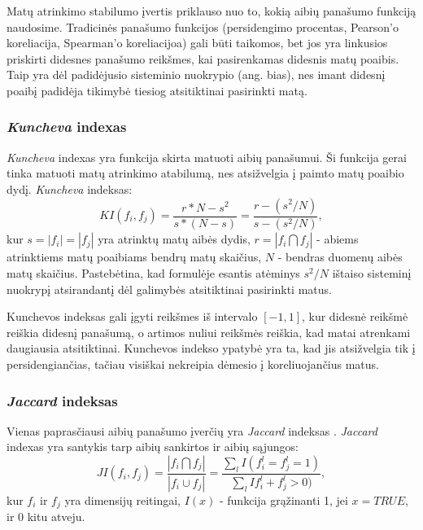 Matų atrinkimo stabilumo įvertis priklauso nuo to, kokią aibių panašumo funkciją naudosime. Tradicinės panašumo funkcijos (persidengimo procentas, Pearson'o koreliacija, Spearman'o koreliacijoa) gali būti taikomos, bet jos yra linkusios priskirti didesnes panašumo reikšmes, kai pasirenkamas didesnis matų poaibis. Taip yra dėl padidėjusio sisteminio nuokrypio (ang. bias), nes imant didesnį poaibį padidėja tikimybė tiesiog atsitiktinai pasirinkti matą.

\subsubsection{\textit{Kuncheva} indexas}

\textit{Kuncheva} indexas \cite{DBLP:conf/aia/Kuncheva07} yra funkcija skirta matuoti aibių panašumui. Ši funkcija gerai tinka matuoti matų atrinkimo atabilumą, nes atsižvelgia į paimto matų poaibio dydį. \textit{Kuncheva} indeksas:
\begin{equation}
\label{kuncheva_index}
 KI(f_i, f_j)=\frac{r*N - s^2}{s*(N-s)}=\frac{r - (s^2/N)}{s - (s^2/N)},
\end{equation}		
kur $s=|f_i|=|f_j|$ yra atrinktų matų aibės dydis, $r=|f_i \bigcap f_j|$ - abiems atrinktiems matų poaibiams bendrų matų skaičius, $N$ - bendras  duomenų aibės matų skaičius. Pastebėtina, kad formulėje esantis atėminys $s^2/N$ ištaiso sisteminį nuokrypį atsirandantį dėl galimybės atsitiktinai pasirinkti matus. 

Kunchevos indeksas gali įgyti reikšmes iš intervalo $[-1, 1]$, kur didesnė reikšmė reiškia didesnį panašumą, o artimos nuliui reikšmės reiškia, kad matai atrenkami daugiausia atsitiktinai. Kunchevos indekso ypatybė yra ta, kad jis atsižvelgia tik į persidengiančias, tačiau visiškai nekreipia dėmesio į koreliuojančius matus.

\subsubsection{\textit{Jaccard} indeksas}

Vienas paprasčiausi aibių panašumo įverčių yra \textit{Jaccard} indeksas \cite{jaccard1901etude}. \textit{Jaccard} indexas yra santykis tarp aibių sankirtos ir aibių sąjungos:
\begin{equation}
\label{jaccard_index}
 JI(f_i, f_j)=\frac{|f_i \bigcap f_j|}{|f_i \cup f_j|}=\frac{\sum_{l}I(f_i^l=f_j^l=1)}{\sum_{l}I{f_i^l+f_j^l > 0)}}, 
\end{equation}
kur $f_i$ ir $f_j$ yra dimensijų reitingai, $I(x)$ - funkcija grąžinanti 1, jei $x=TRUE$, ir 0 kitu atveju.

